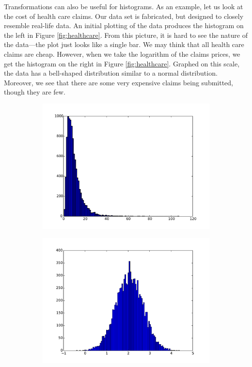 Transformations can also be useful for histograms.
As an example, let us look at the cost of health care claims. 
Our data set is fabricated, but designed to closely resemble real-life data. 
An initial plotting of the data produces the histogram on the left in Figure \ref{fig:healthcare}. 
From this picture, it is hard to see the nature of the data---the plot just looks like a single bar. 
We may think that all health care claims are cheap. 
However, when we take the logarithm of the claims prices, we get the histogram on the right in Figure \ref{fig:healthcare}. 
Graphed on this scale, the data has a bell-shaped distribution similar to a normal distribution. 
Moreover, we see that there are some very expensive claims being submitted, though they are few. 
\begin{figure}
\centering
\begin{subfigure}{.5\textwidth}
  \centering
  \includegraphics[width=\textwidth]{healthcare_linscale.pdf}
\end{subfigure}%
\begin{subfigure}{.5\textwidth}
  \centering
  \includegraphics[width=\textwidth]{healthcare_logscale.pdf}

\end{subfigure}
\end{figure}
